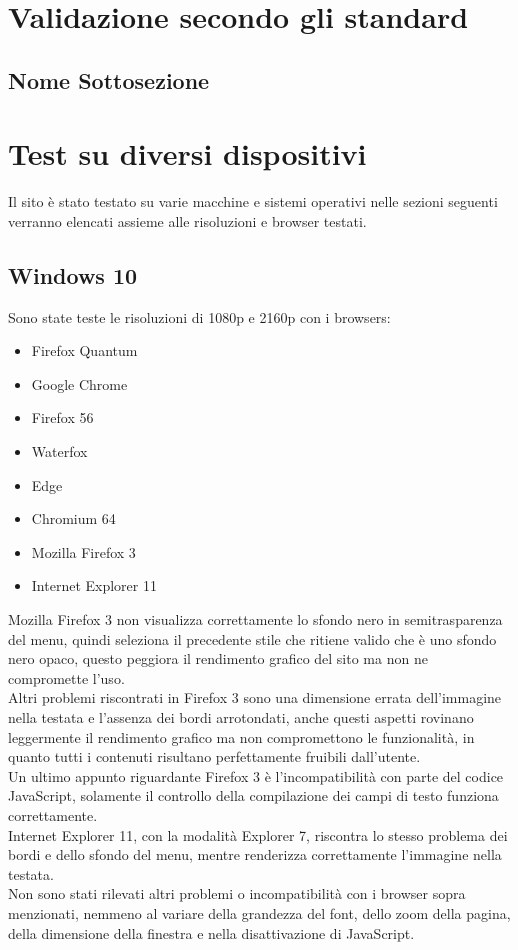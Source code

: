 \documentclass[openany, a4paper, 12pt]{report}
\begin{document}
		\section{Validazione secondo gli standard}
			\subsection{Nome Sottosezione}
		\section{Test su diversi dispositivi}
			Il sito è stato testato su varie macchine e sistemi operativi nelle sezioni seguenti verranno elencati assieme alle risoluzioni e browser testati.
				\subsection{Windows 10}
				Sono state teste le risoluzioni di 1080p e 2160p con i browsers:
				\begin{itemize}
					\item Firefox Quantum
					\item Google Chrome
					\item Firefox 56
					\item Waterfox
					\item Edge
					\item Chromium 64
					\item Mozilla Firefox 3
					\item Internet Explorer 11
				\end{itemize}
				Mozilla Firefox 3 non visualizza correttamente lo sfondo nero in semitrasparenza del menu, quindi seleziona il precedente stile che ritiene valido che è uno sfondo nero opaco, questo peggiora il rendimento grafico del sito ma non ne compromette l'uso.\\
				Altri problemi riscontrati in Firefox 3 sono una dimensione errata dell'immagine nella testata e l'assenza dei bordi arrotondati, anche questi aspetti rovinano leggermente il rendimento grafico ma non compromettono le funzionalità, in quanto tutti i contenuti risultano perfettamente fruibili dall'utente.\\
				Un ultimo appunto riguardante Firefox 3 è l'incompatibilità con parte del codice JavaScript, solamente il controllo della compilazione dei campi di testo funziona correttamente.\\
				Internet Explorer 11, con la modalità Explorer 7, riscontra lo stesso problema dei bordi e dello sfondo del menu, mentre renderizza correttamente l'immagine nella testata.\\
				Non sono stati rilevati altri problemi o incompatibilità con i browser sopra menzionati, nemmeno al variare della grandezza del font, dello zoom della pagina, della dimensione della finestra e nella disattivazione di JavaScript.
				
\end{document}
